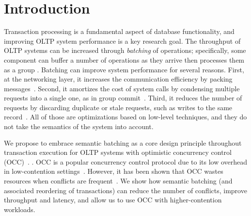 \section{Introduction}\label{sec:intro}

Transaction processing is a fundamental aspect of database functionality, and improving OLTP system performance is a key research goal. The throughput of OLTP systems can be increased through \emph{batching} of operations; specifically, some component can buffer a number of operations as they arrive then processes them as a group \cite{friedman1997packing,debrabant2013anti,hagmann1987reimplementing}.
Batching can improve system performance for several reasons. First, at the networking layer, it increases the communication efficiency by packing messages~\cite{ding2015centiman,friedman1997packing}. Second, it amortizes the cost of system calls by condensing multiple requests into a single one, as in group commit~\cite{debrabant2013anti,hagmann1987reimplementing}. Third, it reduces the number of requests by discarding duplicate or stale requests, such as writes to the same record~\cite{faleiro2014lazy}. All of those are optimizations based on low-level techniques, and they do not take the semantics of the system into account.

We propose to embrace semantic batching as a core design principle throughout transaction execution for OLTP systems with optimistic concurrency control (OCC)~\cite{kung81tods}. .
OCC is a popular concurrency control protocol due to its low overhead in low-contention
settings~\cite{adya97podc, baker11cidr, bernstein2015optimizing,bernstein11cidr,
bernstein11vldb, corbett12osdi,warp, patterson12vldb,peng10osdi,larson2011high}. However, it has been shown that OCC
wastes resources when conflicts are frequent~\cite{agrawal1987concurrency}. We
show how semantic batching (and associated reordering of transactions) can reduce the number of conflicts, improve
throughput and latency, and allow us to use OCC with higher-contention workloads.



